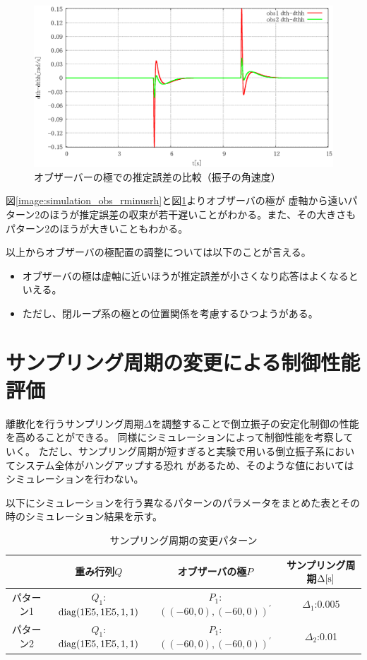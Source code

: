 	\begin{figure}[H]
		\centering
		\includegraphics[width=0.8\linewidth]{gazo/simulation_obs_compare_THETAminusTHETAH.eps}
		\caption{オブザーバーの極での推定誤差の比較（振子の角速度）}
		\label{image:simulation_obs_thetaminusthetah}
	\end{figure} 
	図\ref{image:simulation_obs_rminusrh}と図\ref{image:simulation_obs_thetaminusthetah}よりオブザーバの極が
	虚軸から遠いパターン2のほうが推定誤差の収束が若干遅いことがわかる。また、その大きさもパターン2のほうが大きいこともわかる。
	\par
	以上からオブザーバの極配置の調整については以下のことが言える。
	\begin{itemize}
	  \item オブザーバの極は虚軸に近いほうが推定誤差が小さくなり応答はよくなるといえる。
	  \item ただし、閉ループ系の極との位置関係を考慮するひつようがある。
	\end{itemize}
	
\section{サンプリング周期の変更による制御性能評価}
	離散化を行うサンプリング周期$\Delta$を調整することで倒立振子の安定化制御の性能を高めることができる。
	同様にシミュレーションによって制御性能を考察していく。
	ただし、サンプリング周期が短すぎると実験で用いる倒立振子系においてシステム全体がハングアップする恐れ
	があるため、そのような値においてはシミュレーションを行わない。
	\par
	以下にシミュレーションを行う異なるパターンのパラメータをまとめた表とその時のシミュレーション結果を示す。
	\begin{table}[htb]
		\begin{center}
			\caption{サンプリング周期の変更パターン}
			\medskip
			
			\begin{tabular}{|c|c|c|c|}\hline
				\ \ & 重み行列$Q$ & オブザーバの極$P$ & サンプリング周期$\Delta[\rm{s}]$ \\ \hline\hline
				パターン1 & $Q_1$:$\rm{diag}(1E5,1E5,1,1)$ & $P_1$:$((-60,0),(-60,0))^{'}$ & $\Delta_1$:0.005 \\ \hline
				パターン2 & $Q_1$:$\rm{diag}(1E5,1E5,1,1)$ & $P_1$:$((-60,0),(-60,0))^{'}$ & $\Delta_2$:0.01 \\ \hline
			\end{tabular}
		\end{center}
		\label{table:QRF}
	\end{table}
	

